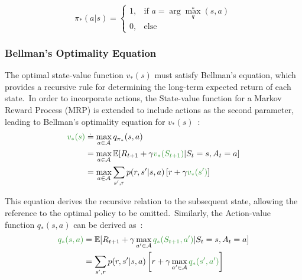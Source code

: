 \documentclass[../xlapes02]{subfiles}
\begin{document}
    \begin{equation}
        \label{eq:greedy-selection}
        \pi_*(a | s) =
        \begin{cases}
            1, & \text{if } a = \arg\max_q^*(s,a) \\
            0, & \text{else}
        \end{cases}
    \end{equation}

    \subsubsection{Bellman's Optimality Equation}\label{subsubsec:bellman-optimality-equation}
    The optimal state-value function $v_*(s)$ must satisfy Bellman's equation, which provides a recursive rule for determining the long-term expected return of each state.\ In order to incorporate actions, the State-value function for a Markov Reward Process (MRP) is extended to include actions as the second parameter, leading to Bellman's optimality equation for $v_*(s)$~\cite{sutton2018reinforcement}:
    \begin{equation}
        \label{eq:bellman-optimal-state-value-function}
        \begin{split}
            \textcolor[RGB]{50,150,50}{v_*(s)}&\doteq\max_{a\in\mathcal{A}}q_{\pi_*}(s,a)\\
            &=\max_{a\in\mathcal{A}}\mathbb{E}[R_{t+1}+\gamma\textcolor[RGB]{50,150,50}{v_*(S_{t+1})}|S_t=s,A_t=a]\\
            &=\max_{a\in\mathcal{A}}\sum_{s',r}p(r,s'|s,a)\left[r+\gamma\textcolor[RGB]{50,150,50}{v_*(s')}\right]
        \end{split}
    \end{equation}

    This equation derives the recursive relation to the subsequent state, allowing the reference to the optimal policy to be omitted.\ Similarly, the Action-value function $q_*(s, a)$ can be derived as~\cite{sutton2018reinforcement}:
    \begin{equation}
        \label{eq:bellman-optimal-action-value-function}
        \begin{split}
            \textcolor[RGB]{50,150,50}{q_*(s, a)}&=\mathbb{E}[R_{t+1}+\gamma\max_{a'\in\mathcal{A}}\textcolor[RGB]{50,150,50}{q_*(S_{t+1},a')}|S_t=s,A_t=a]\\
            &=\sum_{s',r}p(r,s'|s,a)\left[r+\gamma\max_{a'\in\mathcal{A}}\textcolor[RGB]{50,150,50}{q_*(s',a')}\right]
        \end{split}
    \end{equation}
\end{document}
